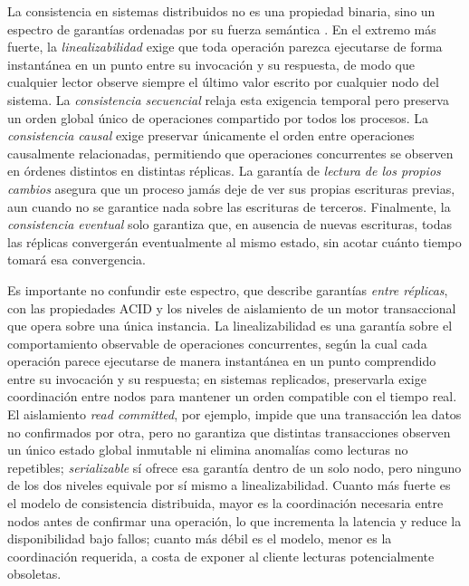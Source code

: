 \documentclass[conference]{IEEEtran}
\begin{document}
La consistencia en sistemas distribuidos no es una propiedad binaria, sino un espectro de garant\'ias ordenadas por su fuerza sem\'antica \cite{viotti2016}. En el extremo m\'as fuerte, la \emph{linealizabilidad} exige que toda operaci\'on parezca ejecutarse de forma instant\'anea en un punto entre su invocaci\'on y su respuesta, de modo que cualquier lector observe siempre el \'ultimo valor escrito por cualquier nodo del sistema. La \emph{consistencia secuencial} relaja esta exigencia temporal pero preserva un orden global \'unico de operaciones compartido por todos los procesos. La \emph{consistencia causal} exige preservar \'unicamente el orden entre operaciones causalmente relacionadas, permitiendo que operaciones concurrentes se observen en \'ordenes distintos en distintas r\'eplicas. La garant\'ia de \emph{lectura de los propios cambios} asegura que un proceso jam\'as deje de ver sus propias escrituras previas, aun cuando no se garantice nada sobre las escrituras de terceros. Finalmente, la \emph{consistencia eventual} solo garantiza que, en ausencia de nuevas escrituras, todas las r\'eplicas converger\'an eventualmente al mismo estado, sin acotar cu\'anto tiempo tomar\'a esa convergencia.

Es importante no confundir este espectro, que describe garant\'ias \emph{entre r\'eplicas}, con las propiedades ACID y los niveles de aislamiento de un motor transaccional que opera sobre una \'unica instancia. La linealizabilidad es una garant\'ia sobre el comportamiento observable de operaciones concurrentes, seg\'un la cual cada operaci\'on parece ejecutarse de manera instant\'anea en un punto comprendido entre su invocaci\'on y su respuesta; en sistemas replicados, preservarla exige coordinaci\'on entre nodos para mantener un orden compatible con el tiempo real. El aislamiento \emph{read committed}, por ejemplo, impide que una transacci\'on lea datos no confirmados por otra, pero no garantiza que distintas transacciones observen un \'unico estado global inmutable ni elimina anomal\'ias como lecturas no repetibles; \emph{serializable} s\'i ofrece esa garant\'ia dentro de un solo nodo, pero ninguno de los dos niveles equivale por s\'i mismo a linealizabilidad. Cuanto m\'as fuerte es el modelo de consistencia distribuida, mayor es la coordinaci\'on necesaria entre nodos antes de confirmar una operaci\'on, lo que incrementa la latencia y reduce la disponibilidad bajo fallos; cuanto m\'as d\'ebil es el modelo, menor es la coordinaci\'on requerida, a costa de exponer al cliente lecturas potencialmente obsoletas.
\end{document}
